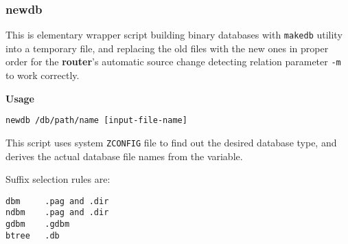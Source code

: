 \subsubsection{newdb}



This is elementary wrapper script building binary databases
with {\tt makedb} utility into a temporary file, and replacing
the old files with the new ones in proper order for the 
{\bf router}'s automatic source change detecting relation 
parameter {\tt -m} to work correctly.

{\bf Usage}

\begin{verbatim}
newdb /db/path/name [input-file-name]
\end{verbatim}


This script uses system {\tt ZCONFIG} file to find out the desired
database type, and derives the actual database file names from the 
variable.

Suffix selection rules are:

\begin{verbatim}
dbm     .pag and .dir
ndbm    .pag and .dir
gdbm    .gdbm
btree   .db   
\end{verbatim}
